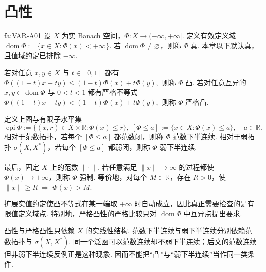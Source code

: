 \section{凸性}\label{sec:iii06-convexity}

\begin{FADefinition}{fa:VAR-A01}
设 \(\displaystyle X\) 为实 Banach 空间，\(\displaystyle\Phi:X\to(-\infty,+\infty]\). 定义有效定义域
\(\displaystyle \operatorname{dom}\Phi := \{x\in X:\Phi(x)<+\infty\}.\)
若 \(\displaystyle\operatorname{dom}\Phi\neq\varnothing\)，则称 \(\displaystyle\Phi\) 真. 本章以下默认真，且值域约定已排除 \(\displaystyle-\infty\).

若对任意 \(\displaystyle x,y\in X\) 与 \(\displaystyle t\in[0,1]\) 都有
\(\displaystyle \Phi((1-t)x+ty) \leqslant (1-t)\Phi(x)+t\Phi(y),\)
则称 \(\displaystyle\Phi\) 凸. 若对任意互异的 \(\displaystyle x,y\in\operatorname{dom}\Phi\) 与 \(\displaystyle0<t<1\) 都有严格不等式
\(\displaystyle \Phi((1-t)x+ty) < (1-t)\Phi(x)+t\Phi(y),\)
则称 \(\displaystyle\Phi\) 严格凸.

定义上图与有限子水平集
\[
\operatorname{epi}\Phi
:=
\{(x,r)\in X\times\mathbb R:\Phi(x)\leqslant r\},
\;
[\Phi\leqslant a]
:=
\{x\in X:\Phi(x)\leqslant a\},
\quad a\in\mathbb R.
\]
相对于范数拓扑，若每个 \(\displaystyle[\Phi\leqslant a]\) 都范数闭，则称 \(\displaystyle\Phi\) 范数下半连续. 相对于弱拓扑 \(\displaystyle\sigma(X,X^*)\)，若每个 \(\displaystyle[\Phi\leqslant a]\) 都弱闭，则称 \(\displaystyle\Phi\) 弱下半连续.

最后，固定 \(\displaystyle X\) 上的范数 \(\displaystyle\|\cdot\|\). 若任意满足 \(\displaystyle\|x\|\to\infty\) 的过程都使 \(\displaystyle\Phi(x)\to+\infty\)，则称 \(\displaystyle\Phi\) 强制. 等价地，对每个 \(\displaystyle M\in\mathbb R\)，存在 \(\displaystyle R>0\)，使
\(\displaystyle \|x\|\geqslant R \;\Longrightarrow\; \Phi(x)>M.\)
\end{FADefinition}

扩展实值约定使凸不等式在某一端取 \(\displaystyle+\infty\) 时自动成立，因此真正需要检查的是有限值定义域点. 特别地，严格凸性的严格比较只对 \(\displaystyle\operatorname{dom}\Phi\) 中互异点提出要求.

\begin{FARemark}[线性结构与拓扑结构的边界]
凸性与严格凸性只依赖 \(\displaystyle X\) 的实线性结构. 范数下半连续与弱下半连续分别依赖范数拓扑与 \(\displaystyle\sigma(X,X^*)\). 同一个泛函可以范数连续却不弱下半连续；后文的范数连续但非弱下半连续反例正是这种现象. 因而不能把“凸”与“弱下半连续”当作同一类条件.
\end{FARemark}

